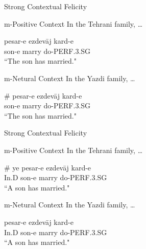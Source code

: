 \documentclass[10pt]{beamer}
\begin{document}

\begin {frame}{Strong Contextual Felicity}

\begin {exampleblock} {m-Positive Context}
In the Tehrani family, \dots
	\begin {exe}
		\ex \label {tehrani} 
			\gll 	pesar-{\color{blue}e}	ezdev\={a}j kard-e \\
				son-e	marry do-{\scriptsize PERF.3.SG}\\
			\glt 	``The son has married."
	\end {exe}
\end {exampleblock}
\pause
\begin {exampleblock} {m-Netural Context}
In the Yazdi family, \dots
	\begin {exe}
		\ex \label {tehrani} 
			\gll 	\# pesar-{\color{blue}e}	ezdev\={a}j kard-e \\
				{} son-e	marry do-{\scriptsize PERF.3.SG}\\
			\glt 	``The son has married."
	\end {exe}
\end {exampleblock}

\end {frame}


\begin {frame}{Strong Contextual Felicity}

\begin {exampleblock} {m-Positive Context}
In the Tehrani family, \dots
	\begin {exe}
		\ex \label {tehrani} 
			\gll 	\# {\color{red} ye} 		pesar-{\color{blue}e}	ezdev\={a}j kard-e \\
				{}	In.D	son-e	marry do-{\scriptsize PERF.3.SG}\\
			\glt 	``A son has married."
	\end {exe}
\end {exampleblock}
\pause
\begin {exampleblock} {m-Netural Context}
In the Yazdi family, \dots
	\begin {exe}
		\ex \label {tehrani} 
			 pesar-{\color{blue}e}	ezdev\={a}j kard-e \\
				In.D	son-e	marry do-{\scriptsize PERF.3.SG}\\
			\glt 	``A son has married."
	\end {exe}
\end {exampleblock}

\end {frame}
\end{document}
